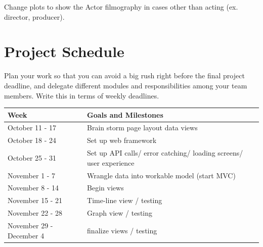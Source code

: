 \documentclass[12pt]{article}
\begin{document}
Change plots to show the Actor filmography in cases other than acting (ex. director, producer).

\newpage

\section{Project Schedule}
Plan your work so that you can avoid a big rush right before the final project deadline, and delegate different modules and responsibilities among your team members. Write this in terms of weekly deadlines.
\begin{center}
    \begin{tabular}{l l}
        \hline
        \textbf{Week} & \textbf{Goals and Milestones}\\
        \hline
        October 11 - 17				& Brain storm page layout data views \\
        October 18 - 24				& Set up web framework \\
        October 25 - 31				& Set up API calls/ error catching/ loading screens/ user experience \\
        November 1 - 7				& Wrangle data into workable model (start MVC) \\
        November 8 - 14 			& Begin views \\
        November 15 - 21			& Time-line view / testing \\
        November 22 - 28			& Graph view / testing	\\
        November 29 - December 4	& finalize views / testing \\
    \end{tabular}
\end{center}
\end{document}
